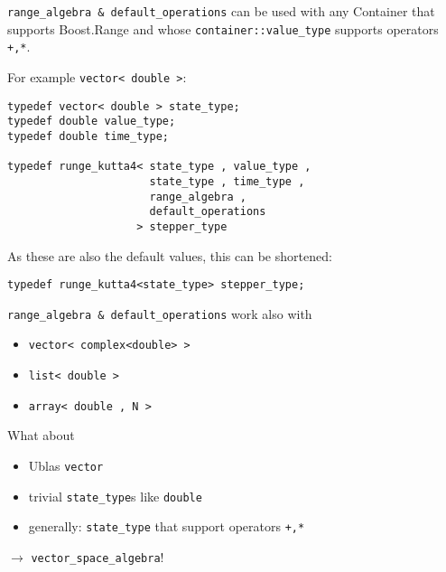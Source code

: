 \begin{frame}[fragile]

\lstinline+range_algebra & default_operations+ can be used with any Container that supports Boost.Range and whose \lstinline+container::value_type+ supports operators \lstinline!+,*!.

For example \lstinline+vector< double >+:
\begin{lstlisting}
typedef vector< double > state_type;
typedef double value_type;
typedef double time_type;

typedef runge_kutta4< state_type , value_type , 
                      state_type , time_type , 
                      range_algebra , 
                      default_operations 
                    > stepper_type
\end{lstlisting}
As these are also the default values, this can be shortened:
\begin{lstlisting}
typedef runge_kutta4<state_type> stepper_type; 
\end{lstlisting}

\end{frame}


\begin{frame}[fragile]
 \lstinline+range_algebra & default_operations+ work also with

\begin{itemize}
 \item \lstinline+vector< complex<double> >+
 \item \lstinline+list< double >+
 \item \lstinline+array< double , N >+
\end{itemize}

\pause
What about
\begin{itemize}
 \item Ublas \lstinline+vector+
 \item trivial \lstinline+state_type+s like \lstinline+double+
 \item generally: \lstinline+state_type+ that support operators \lstinline!+,*!
\end{itemize}

\vspace{1em}
\centerline{$\longrightarrow$ \lstinline+vector_space_algebra+!}

\end{frame}


